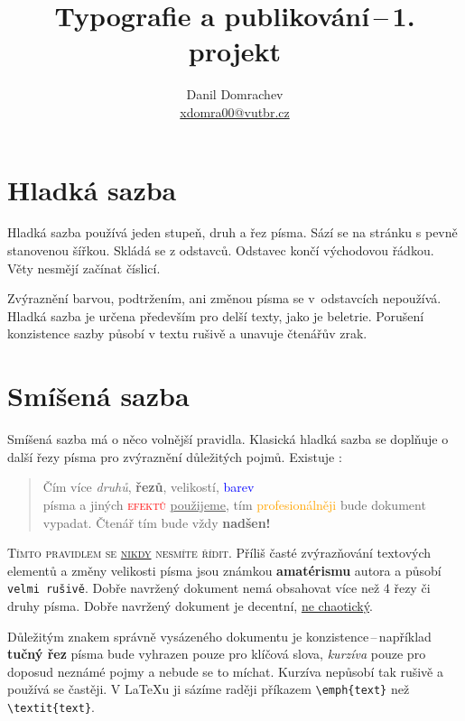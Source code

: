 \documentclass[twocolumn,a4paper,10pt,final]{article}
\title{Typografie a publikování\,--\,1. projekt}
\author{Danil Domrachev \\ \href{mailto:xdomra00@vutbr.cz}{xdomra00@vutbr.cz}}
\date{}
\begin{document}
	\maketitle
	\section{Hladká sazba}\label{sec:hladka-sazba} 
	Hladká sazba používá jeden stupeň, druh a řez písma.
	Sází se na stránku s pevně stanovenou šířkou.
	Skládá se z odstavců. Odstavec končí východovou řádkou.
	Věty nesmějí začínat číslicí.
	
	Zvýraznění barvou, podtržením, ani změnou písma se v~odstavcích nepoužívá.
	Hladká sazba je určena především pro delší texty, jako je beletrie.
	Porušení konzistence sazby působí v textu rušivě a unavuje čtenářův zrak.
	\section{Smíšená sazba}\label{sec:smisena-sazba}
	Smíšená sazba má o něco volnější pravidla.
	Klasická hladká sazba se doplňuje o další řezy písma pro zvýraznění důležitých pojmů.
	Existuje :
	\begin{quotation}
		Čím více \emph{druhů}, \textbf{řezů}, {\huge velikostí}, \textcolor{blue}{barev}\\
		písma a jiných \textcolor{red}{\textsc{efektů}} \underline{použijeme}, tím \textcolor{orange}{profesionálněji}
		bude {\selectfont\Large{dokument}} vypadat. {\tiny{Čtenář}} tím bude vždy {\textbf{\Huge{nadšen!}}}
	\end{quotation}

	\textsc{Tímto pravidlem se \underline{nikdy} nesmíte řídit.}
	Příliš časté zvýrazňování textových elementů a změny {\tiny{velikosti}} písma jsou známkou \textbf{amatérismu} autora a působí \texttt{velmi rušivě}.
	Dobře navržený dokument nemá obsahovat více než 4 řezy či druhy písma.
	Dobře navržený dokument je decentní, \underline{ne chaotický}.
	
	Důležitým znakem správně vysázeného dokumentu je konzistence\,--\,například \textbf{tučný řez} písma bude vyhrazen pouze pro klíčová slova, \emph{kurzíva} pouze pro doposud neznámé pojmy a nebude se to míchat.
	Kurzíva nepůsobí tak rušivě a používá se častěji.
	V \LaTeX u ji sázíme raději příkazem \verb!\emph{text}! než \verb!\textit{text}!.
	
\end{document}
